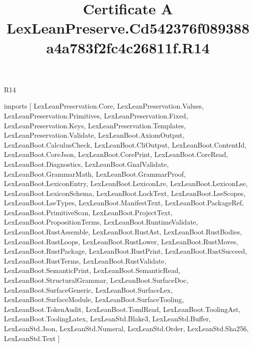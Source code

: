 \begin{lexlean}{R14}
\title{Certificate A LexLeanPreserve.Cd542376f089388a4a783f2fc4c26811f.R14}
\begin{coremodule}
imports [
  LexLeanPreservation.Core,
  LexLeanPreservation.Values,
  LexLeanPreservation.Primitives,
  LexLeanPreservation.Fixed,
  LexLeanPreservation.Keys,
  LexLeanPreservation.Templates,
  LexLeanPreservation.Validate,
  LexLeanBoot.AxiomOutput,
  LexLeanBoot.CalculusCheck,
  LexLeanBoot.CliOutput,
  LexLeanBoot.ContentId,
  LexLeanBoot.CoreJson,
  LexLeanBoot.CorePrint,
  LexLeanBoot.CoreRead,
  LexLeanBoot.Diagnostics,
  LexLeanBoot.GnafValidate,
  LexLeanBoot.GrammarMath,
  LexLeanBoot.GrammarProof,
  LexLeanBoot.LexiconEntry,
  LexLeanBoot.LexiconLre,
  LexLeanBoot.LexiconLse,
  LexLeanBoot.LexiconSchema,
  LexLeanBoot.LockText,
  LexLeanBoot.LseScopes,
  LexLeanBoot.LseTypes,
  LexLeanBoot.ManifestText,
  LexLeanBoot.PackageRef,
  LexLeanBoot.PrimitiveScan,
  LexLeanBoot.ProjectText,
  LexLeanBoot.PropositionTerms,
  LexLeanBoot.RuntimeValidate,
  LexLeanBoot.RustAssemble,
  LexLeanBoot.RustAst,
  LexLeanBoot.RustBodies,
  LexLeanBoot.RustLoops,
  LexLeanBoot.RustLower,
  LexLeanBoot.RustMoves,
  LexLeanBoot.RustPackage,
  LexLeanBoot.RustPrint,
  LexLeanBoot.RustSucceed,
  LexLeanBoot.RustTerms,
  LexLeanBoot.RustValidate,
  LexLeanBoot.SemanticPrint,
  LexLeanBoot.SemanticRead,
  LexLeanBoot.StructuralGrammar,
  LexLeanBoot.SurfaceDoc,
  LexLeanBoot.SurfaceGeneric,
  LexLeanBoot.SurfaceLex,
  LexLeanBoot.SurfaceModule,
  LexLeanBoot.SurfaceTooling,
  LexLeanBoot.TokenAudit,
  LexLeanBoot.TomlRead,
  LexLeanBoot.ToolingAst,
  LexLeanBoot.ToolingLatex,
  LexLeanStd.Blake3,
  LexLeanStd.Buffer,
  LexLeanStd.Json,
  LexLeanStd.Numeral,
  LexLeanStd.Order,
  LexLeanStd.Sha256,
  LexLeanStd.Text
]


\end{coremodule}
\end{lexlean}
